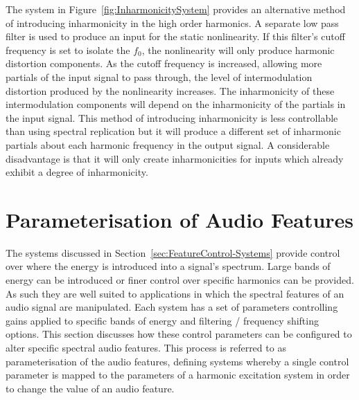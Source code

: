 		The system in Figure~\ref{fig:InharmonicitySystem} provides an alternative method of introducing
		inharmonicity in the high order harmonics. A separate low pass filter is used to produce an input for the
		static nonlinearity. If this filter's cutoff frequency is set to isolate the $f_{0}$, the nonlinearity will
		only produce harmonic distortion components. As the cutoff frequency is increased, allowing more partials
		of the input signal to pass through, the level of intermodulation distortion produced by the nonlinearity
		increases. The inharmonicity of these intermodulation components will depend on the inharmonicity of the
		partials in the input signal. This method of introducing inharmonicity is less controllable than using
		spectral replication but it will produce a different set of inharmonic partials about each harmonic
		frequency in the output signal. A considerable disadvantage is that it will only create inharmonicities for
		inputs which already exhibit a degree of inharmonicity.

\section{Parameterisation of Audio Features}
\label{sec:FeatureControl-Parameterisation}
	The systems discussed in Section~\ref{sec:FeatureControl-Systems} provide control over where the energy is
	introduced into a signal's spectrum. Large bands of energy can be introduced or finer control over specific
	harmonics can be provided. As such they are well suited to applications in which the spectral features of an audio
	signal are manipulated. Each system has a set of parameters controlling gains applied to specific bands of energy
	and filtering / frequency shifting options. This section discusses how these control parameters can be configured
	to alter specific spectral audio features. This process is referred to as parameterisation of the audio features,
	defining systems whereby a single control parameter is mapped to the parameters of a harmonic excitation system in
	order to change the value of an audio feature.

